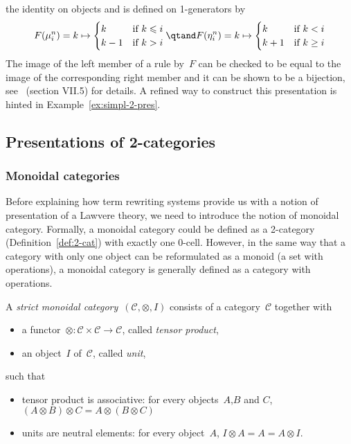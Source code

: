 \documentclass{LMCS}
\renewcommand{\leq}{\leqslant}
\renewcommand{\C}{\mathcal{C}}
\begin{document}
\begin{exa}
  the identity on objects and is defined on 1-generators by
  \[
  F(\mu_i^n)=k\mapsto
  \begin{cases}
    k&\text{if $k\leq i$}\\
    k-1&\text{if $k>i$}\\
  \end{cases}
  \qtand
  F(\eta_i^n)=k\mapsto
  \begin{cases}
    k&\text{if $k<i$}\\
    k+1&\text{if $k\geq i$}\\
  \end{cases}
  \]
  The image of the left member of a rule by~$F$ can be checked to be equal to
  the image of the corresponding right member and it can be shown to be a
  bijection, see~\cite{maclane:cwm} (section VII.5) for details. A refined way
  to construct this presentation is hinted in Example~\ref{ex:simpl-2-pres}.
\end{exa}

\subsection{Presentations of 2-categories}
\subsubsection{Monoidal categories}
Before explaining how term rewriting systems provide us with a notion of
presentation of a Lawvere theory, we need to introduce the notion of monoidal
category. Formally, a monoidal category could be defined as a 2-category
(Definition~\ref{def:2-cat}) with exactly one 0-cell. However, in the same way
that a category with only one object can be reformulated as a monoid (\ie a set
with operations), a monoidal category is generally defined as a category with
operations.

\begin{defi}
  \label{def:mon-cat}
  A \emph{strict monoidal category}~$(\C,\otimes,I)$ consists of a category~$\C$
  together with
  \begin{itemize}
  \item a functor~$\otimes:\C\times\C\to\C$, called \emph{tensor product},
  \item an object~$I$ of~$\C$, called \emph{unit},
  \end{itemize}
  such that
  \begin{itemize}
  \item tensor product is associative: for every objects~$A$,$B$ and $C$,
    $(A\otimes B)\otimes C=A\otimes(B\otimes C)$
  \item units are neutral elements: for every object~$A$, $I\otimes A=A=A\otimes
    I$.
  \end{itemize}
\end{defi}
\end{document}
